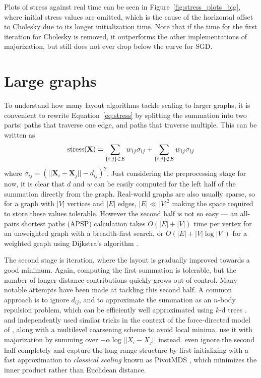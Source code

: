 Plots of stress against real time can be seen in Figure~\ref{fig:stress_plots_big}, where initial stress values are omitted, which is the cause of the horizontal offset to Cholesky due to its longer initialization time.
Note that if the time for the first iteration for Cholesky is removed, it outperforms the other implementations of majorization, but still does not ever drop below the curve for SGD.


\section{Large graphs}
\label{sec:large_graphs}
To understand how many layout algorithms tackle scaling to larger graphs, it is convenient to rewrite Equation~\eqref{eq:stress} by splitting the summation into two parts: paths that traverse one edge, and paths that traverse multiple.
This can be written as
\begin{equation}
  \text{stress}(\mathbf{X}) = \sum_{\{i,j\}\in E}w_{ij}\sigma_{ij}\\
  + \sum_{\{i,j\}\notin E}w_{ij}\sigma_{ij}
  \label{split stress}
\end{equation}
where $\sigma_{ij} = (||\mathbf{X}_i - \mathbf{X}_j|| - d_{ij})^2$.
Just considering the preprocessing stage for now, it is clear that $d$ and $w$ can be easily computed for the left half of the summation directly from the graph. Real-world graphs are also usually sparse, so for a graph with $|V|$ vertices and $|E|$ edges, $|E| \ll |V|^2$ making the space required to store these values tolerable. However the second half is not so easy --- an all-pairs shortest paths (APSP) calculation takes $O(|E| + |V|)$ time per vertex for an unweighted graph with a breadth-first search, or $O(|E| + |V|\log|V|)$ for a weighted graph using Dijkstra's algorithm \citep{Cormen2009}.

The second stage is iteration, where the layout is gradually improved towards a good minimum. Again, computing the first summation is tolerable, but the number of longer distance contributions quickly grows out of control. Many notable attempts have been made at tackling this second half. A common approach is to ignore $d_{ij}$, and to approximate the summation as an $n$-body repulsion problem, which can be efficiently well approximated using $k$-d trees \citep{Barnes1986}. \citet{Hu2005} and independently \citet{Hachul2004} used similar tricks in the context of the force-directed model of \citet{Fruchterman1991}, along with a multilevel coarsening scheme to avoid local minima. \citet{Gansner2013} use it with majorization by summing over $-\alpha \log||X_i - X_j||$ instead. \citet{Brandes2007Eigensolver} even ignore the second half completely and capture the long-range structure by first initializing with a fast approximation to \emph{classical scaling} known as PivotMDS \citep{Brandes2008}, which minimizes the inner product rather than Euclidean distance.

